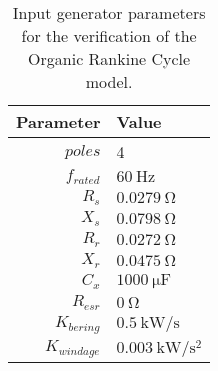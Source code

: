 \begin{table}%
	\centering
	\caption{Input generator parameters for the verification of the Organic Rankine Cycle model.}
	\label{tab:verification_SCIG_params}
	\begin{tabular}{rl}
		\toprule
		    Parameter & Value                                       \\ \midrule
		      $poles$ & 4                                           \\
		  $f_{rated}$ & $\SI{60}{\hertz}$                           \\
		        $R_s$ & $\SI{0.0279}{\ohm}$                         \\
		        $X_s$ & $\SI{0.0798}{\ohm}$                         \\
		        $R_r$ & $\SI{0.0272}{\ohm}$                         \\
		        $X_r$ & $\SI{0.0475}{\ohm}$                         \\
		        $C_x$ & $\SI{1000}{\micro\farad}$                   \\
		    $R_{esr}$ & $\SI{0}{\ohm}$                              \\
		 $K_{bering}$ & $\SI{0.5}{\kilo\watt\per\second}$           \\
		$K_{windage}$ & $\SI{0.003}{\kilo\watt\per\second\squared}$ \\ \bottomrule
	\end{tabular}
\end{table}
